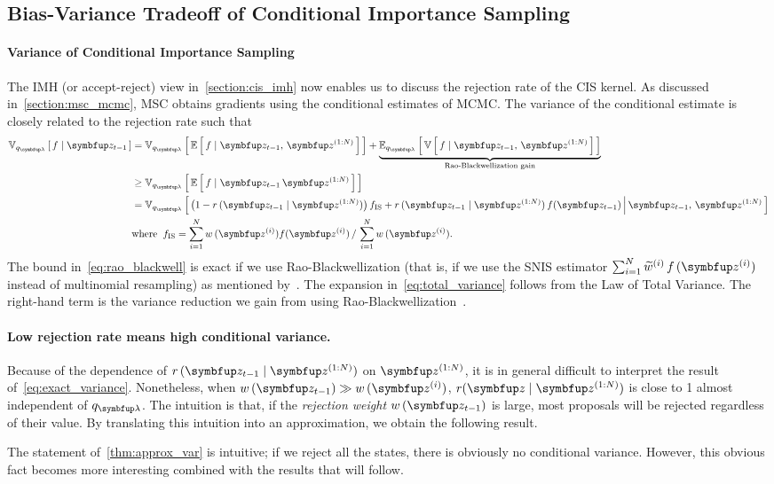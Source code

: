 \subsection{Bias-Variance Tradeoff of Conditional Importance Sampling}\label{section:bias_variance}
\paragraph{Variance of Conditional Importance Sampling}
The IMH (or accept-reject) view in~\cref{section:cis_imh} now enables us to discuss the rejection rate of the CIS kernel.
As discussed in~\cref{section:msc_mcmc}, MSC obtains gradients using the conditional estimates of MCMC.
The variance of the conditional estimate is closely related to the rejection rate such that
\begin{align}
  \Vsub{q_{\vlambda}}{f \mid \vz_{t-1}} 
  &=\Vsub{q_{\vlambda}}{ \E{ f \mid \vz_{t-1},\,\vz^{(1:N)} } } + \underbrace{\Esub{q_{\vlambda}}{ \V{ f \mid \vz_{t-1},\,\vz^{(1:N)} } }}_{\text{Rao-Blackwellization gain}} \label{eq:total_variance} \\
  &\geq \Vsub{q_{\vlambda}}{ \E{ f \mid \vz_{t-1}\,\vz^{(1:N)} } } \label{eq:rao_blackwell}\\
  &= \Vsub{q_{\vlambda}}{ \big(1 - r\,(\vz_{t-1}\mid\vz^{(1:N)})\big)\, f_{\mathrm{IS}}
    + r\,(\vz_{t-1}\mid\vz^{(1:N)})\,f(\vz_{t-1}) \,\middle\vert\, \vz_{t-1},\, \vz^{(1:N)} } \label{eq:exact_variance} \\
  &\text{where}\;\; f_{\mathrm{IS}} = {\sum_{i=1}^N w\,(\vz^{(i)}) f(\vz^{(i)})\,/\,\sum_{i=1}^N w\,(\vz^{(i)})}. \nonumber 
\end{align}
%
The bound in~\eqref{eq:rao_blackwell} is exact if we use Rao-Blackwellization (that is, if we use the SNIS estimator \(\sum^{N}_{i=1} \widetilde{w}^{(i)}\,f\,(\vz^{(i)})\) instead of multinomial resampling) as mentioned by~\citet{NEURIPS2020_b2070693}.
The expansion in~\eqref{eq:total_variance} follows from the Law of Total Variance.
The right-hand term is the variance reduction we gain from using Rao-Blackwellization~\citep{bernton_locally_2015}.

\vspace{-0.1in}
\paragraph{Low rejection rate means high conditional variance.}
Because of the dependence of \(r\,(\vz_{t-1}\mid\vz^{(1:N)})\) on \(\vz^{(1:N)}\), it is in general difficult to interpret the result of~\eqref{eq:exact_variance}.
Nonetheless, when \(w\,(\vz_{t-1}) \gg w\,(\vz^{(i)})\), \(r(\vz\mid\vz^{(1:N)})\) is close to 1 almost independent of \(q_{\vlambda}\).
The intuition is that, if the \textit{rejection weight} \(w\,(\vz_{t-1})\) is large, most proposals will be rejected regardless of their value.
By translating this intuition into an approximation, we obtain the following result.
%

%
The statement of~\cref{thm:approx_var} is intuitive; if we reject all the states, there is obviously no conditional variance.
However, this obvious fact becomes more interesting combined with the results that will follow.

